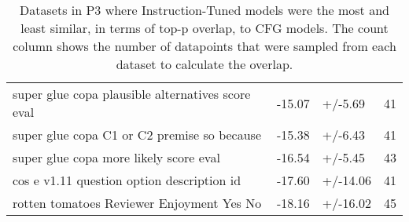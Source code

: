 \documentclass{article}
\begin{document}
\begin{table}[t]
\begin{tabular}{lrlr}
super glue copa plausible alternatives score eval & -15.07 &   +/-5.69 &     41 \\
super glue copa C1 or C2 premise so because       & -15.38 &   +/-6.43 &     41 \\
super glue copa more likely score eval            & -16.54 &   +/-5.45 &     43 \\
cos e v1.11 question option description id        & -17.60 &  +/-14.06 &     41 \\
rotten tomatoes Reviewer Enjoyment Yes No         & -18.16 &  +/-16.02 &     45 \\
\bottomrule
\end{tabular}
\caption{Datasets in P3 where Instruction-Tuned models were the most and least similar, in terms of top-p overlap, to CFG models. The count column shows the number of datapoints that were sampled from each dataset to calculate the overlap.}
\label{tab:cfg_instruct_datasets}
\end{table}
\end{document}
